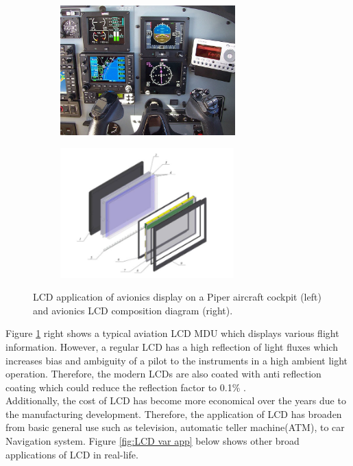 \begin{figure}[!ht]
\Centering
%    
  \begin{subfigure}[b]{0.4\textwidth}
    \includegraphics[height=5cm]{Figures/LCD_Avionics_5inch.jpg}
  \end{subfigure}
  \begin{subfigure}[b]{0.35\textwidth}
    \includegraphics[height=5cm]{Figures/LCD_avionics_composition.PNG}
  \end{subfigure}
%  
  \caption{LCD application of avionics display on a Piper aircraft cockpit \cite{Anonymous5LCD} (left) and avionics LCD composition diagram \cite{Alimova2020MethodsApplications} (right).}
    \label{fig:avionics 5inc}
\end{figure}

\noindent Figure \ref{fig:avionics 5inc} right shows a typical aviation LCD MDU which displays various flight information. However, a regular LCD has a high reflection of light fluxes which increases bias and ambiguity of a pilot to the instruments in a high ambient light operation. Therefore, the modern LCDs are also coated with anti reflection coating which could reduce the reflection factor to 0.1\% \cite{Livada2012AFVCriteria}.\\

\noindent Additionally, the cost of LCD has become more economical over the years due to the manufacturing development. Therefore, the application of LCD has broaden from basic general use such as television, automatic teller machine(ATM), to car Navigation system. Figure \ref{fig:LCD var app} below shows other broad applications of LCD in real-life.\\

